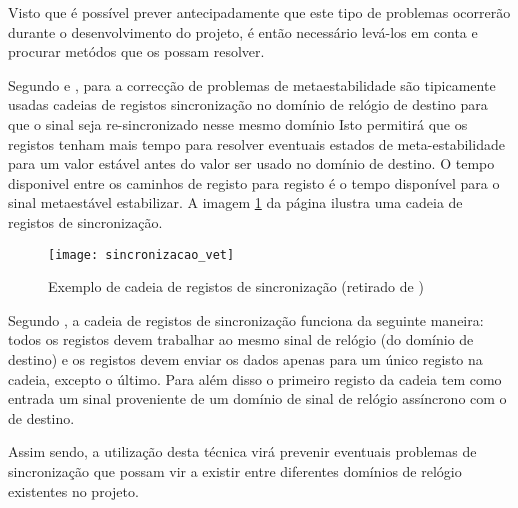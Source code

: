 Visto que é possível prever antecipadamente que este tipo de problemas ocorrerão durante o desenvolvimento do projeto, é então necessário levá-los em conta e procurar metódos que os possam resolver.

Segundo \cite{R037} e \cite{R024}, para a correcção de problemas de metaestabilidade são tipicamente usadas cadeias de registos sincronização no domínio de relógio de destino para que o sinal seja re-sincronizado nesse mesmo domínio Isto permitirá que os registos tenham mais tempo para resolver eventuais estados de meta-estabilidade para um valor estável antes do valor ser usado no domínio de destino.  O tempo disponivel entre os caminhos de registo para registo é o tempo disponível para o sinal metaestável estabilizar. A imagem \ref{fig:sincronizacao} da página \pageref{fig:sincronizacao} ilustra uma cadeia de registos de sincronização.


\begin{figure}[h!]
	\begin{center}
		\leavevmode
		\texttt{[image: sincronizacao\_vet]}
		\caption[Exemplo de cadeia de registos de sincronização]{Exemplo de cadeia de registos de sincronização (retirado de \cite{R037})}
		\label{fig:sincronizacao}
	\end{center}
\end{figure}

Segundo \cite{R037}, a cadeia de registos de sincronização funciona da seguinte maneira: todos os registos devem trabalhar ao mesmo sinal de relógio (do domínio de destino) e os registos devem enviar os dados apenas para um único registo na cadeia, excepto o último. Para além disso o primeiro registo da cadeia tem como entrada um sinal proveniente de um domínio de sinal de relógio assíncrono com o de destino.

Assim sendo, a utilização desta técnica virá prevenir eventuais problemas de sincronização que possam vir a existir entre diferentes domínios de relógio existentes no projeto.